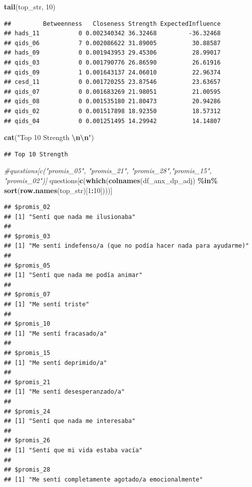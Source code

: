 \documentclass[
]{article}
\newenvironment{Shaded}{\begin{snugshade}}{\end{snugshade}}
\newcommand{\CommentTok}[1]{\textcolor[rgb]{0.56,0.35,0.01}{\textit{#1}}}
\newcommand{\DecValTok}[1]{\textcolor[rgb]{0.00,0.00,0.81}{#1}}
\newcommand{\FunctionTok}[1]{\textcolor[rgb]{0.13,0.29,0.53}{\textbf{#1}}}
\newcommand{\NormalTok}[1]{#1}
\newcommand{\SpecialCharTok}[1]{\textcolor[rgb]{0.81,0.36,0.00}{\textbf{#1}}}
\newcommand{\StringTok}[1]{\textcolor[rgb]{0.31,0.60,0.02}{#1}}
\begin{document}
\begin{Shaded}
\begin{Highlighting}[]
\FunctionTok{tail}\NormalTok{(top\_str, }\DecValTok{10}\NormalTok{)}
\end{Highlighting}
\end{Shaded}

\begin{verbatim}
##         Betweenness   Closeness Strength ExpectedInfluence
## hads_11           0 0.002340342 36.32468         -36.32468
## qids_06           7 0.002086622 31.89005          30.88587
## hads_09           0 0.001943953 29.45306          28.99017
## qids_03           0 0.001790776 26.86590          26.61916
## qids_09           1 0.001643137 24.06010          22.96374
## cesd_11           0 0.001720255 23.87546          23.63657
## qids_07           0 0.001683269 21.98051          21.00595
## qids_08           0 0.001535180 21.80473          20.94286
## qids_02           0 0.001517898 18.92350          18.57312
## qids_04           0 0.001251495 14.29942          14.14807
\end{verbatim}

\begin{Shaded}
\begin{Highlighting}[]
\FunctionTok{cat}\NormalTok{(}\StringTok{"Top 10 Strength }\SpecialCharTok{\textbackslash{}n\textbackslash{}n}\StringTok{"}\NormalTok{)}
\end{Highlighting}
\end{Shaded}

\begin{verbatim}
## Top 10 Strength
\end{verbatim}

\begin{Shaded}
\begin{Highlighting}[]
\CommentTok{\#questions[c("promis\_05", "promis\_21", "promis\_28","promis\_15", "promis\_02")] }
\NormalTok{questions[}\FunctionTok{c}\NormalTok{(}\FunctionTok{which}\NormalTok{(}\FunctionTok{colnames}\NormalTok{(df\_anx\_dp\_adj) }\SpecialCharTok{\%in\%} \FunctionTok{sort}\NormalTok{(}\FunctionTok{row.names}\NormalTok{(top\_str)[}\DecValTok{1}\SpecialCharTok{:}\DecValTok{10}\NormalTok{])))] }
\end{Highlighting}
\end{Shaded}

\begin{verbatim}
## $promis_02
## [1] "Sentí que nada me ilusionaba"
## 
## $promis_03
## [1] "Me sentí indefenso/a (que no podía hacer nada para ayudarme)"
## 
## $promis_05
## [1] "Sentí que nada me podía animar"
## 
## $promis_07
## [1] "Me sentí triste"
## 
## $promis_10
## [1] "Me sentí fracasado/a"
## 
## $promis_15
## [1] "Me sentí deprimido/a"
## 
## $promis_21
## [1] "Me sentí desesperanzado/a"
## 
## $promis_24
## [1] "Sentí que nada me interesaba"
## 
## $promis_26
## [1] "Sentí que mi vida estaba vacía"
## 
## $promis_28
## [1] "Me sentí completamente agotado/a emocionalmente"
\end{verbatim}
\end{document}
